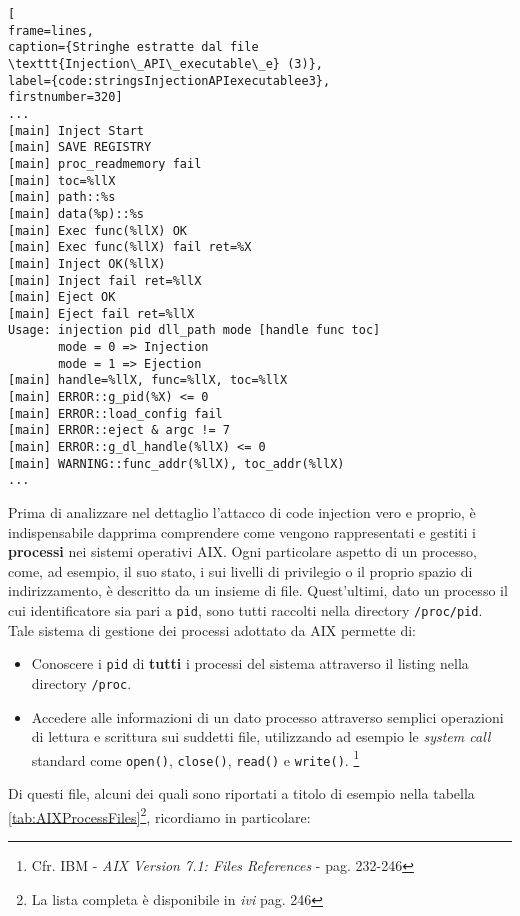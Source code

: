 \documentclass[10pt,a4paper, titlepage]{report}
\begin{document}
\begin{lstlisting}[
frame=lines, 
caption={Stringhe estratte dal file \texttt{Injection\_API\_executable\_e} (3)}, 
label={code:stringsInjectionAPIexecutablee3},
firstnumber=320]
...
[main] Inject Start
[main] SAVE REGISTRY
[main] proc_readmemory fail
[main] toc=%llX
[main] path::%s
[main] data(%p)::%s
[main] Exec func(%llX) OK
[main] Exec func(%llX) fail ret=%X
[main] Inject OK(%llX)
[main] Inject fail ret=%llX
[main] Eject OK
[main] Eject fail ret=%llX
Usage: injection pid dll_path mode [handle func toc]
       mode = 0 => Injection
       mode = 1 => Ejection
[main] handle=%llX, func=%llX, toc=%llX
[main] ERROR::g_pid(%X) <= 0
[main] ERROR::load_config fail
[main] ERROR::eject & argc != 7
[main] ERROR::g_dl_handle(%llX) <= 0
[main] WARNING::func_addr(%llX), toc_addr(%llX)
...
\end{lstlisting}

Prima di analizzare nel dettaglio l'attacco di code injection vero e proprio, è indispensabile dapprima comprendere come vengono rappresentati e gestiti i \textbf{processi} nei sistemi operativi AIX.
Ogni particolare aspetto di un processo, come, ad esempio, il suo stato, i sui livelli di privilegio o il proprio spazio di indirizzamento, è descritto da un insieme di file. Quest'ultimi, dato un processo il cui identificatore sia pari a \texttt{pid}, sono tutti raccolti nella directory \texttt{/proc/pid}. Tale sistema di gestione dei processi adottato da AIX permette di:

\begin{itemize}
\item Conoscere i \texttt{pid} di \textbf{tutti} i processi del sistema attraverso il listing nella directory \texttt{/proc}.
\item Accedere alle informazioni di un dato processo attraverso semplici operazioni di lettura e scrittura sui suddetti file, utilizzando ad esempio le \textit{system call} standard come \texttt{open()}, \texttt{close()}, \texttt{read()} e \texttt{write()}. \footnote{Cfr. IBM - \textit{AIX Version 7.1: Files References} - pag. 232-246}
\end{itemize}

Di questi file, alcuni dei quali sono riportati a titolo di esempio nella tabella \ref{tab:AIXProcessFiles}\footnote{La lista completa è disponibile in \textit{ivi} pag. 246}, ricordiamo in particolare:
\end{document}
